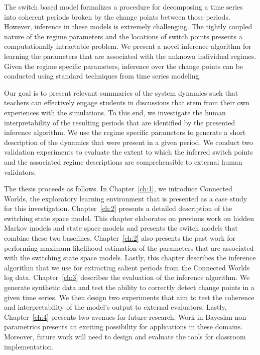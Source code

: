 The switch based model formalizes a procedure for decomposing a time series into coherent periods broken by the change points between those periods. However, inference in these models is extremely challenging. The tightly coupled nature of the regime parameters and the locations of switch points presents a computationally intractable problem. We present a novel inference algorithm for learning the parameters that are associated with the unknown individual regimes. Given the regime specific parameters, inference over the change points can be conducted using standard techniques from time series modeling.

Our goal is to present relevant summaries of the system dynamics such that teachers can effectively engage students in discussions that stem from their own experiences with the simulations. To this end, we investigate the human interpretability of the resulting periods that are identified by the presented inference algorithm. We use the regime specific parameters to generate a short description of the dynamics that were present in a given period. We conduct two validation experiments to evaluate the extent to which the inferred switch points and the associated regime descriptions are comprehensible to external human validators.

The thesis proceeds as follows. In Chapter~\ref{ch:1}, we introduce Connected Worlds, the exploratory learning environment that is presented as a case study for this investigation. Chapter~\ref{ch:2} presents a detailed description of the switching state space model. This chapter elaborates on previous work on hidden Markov models and state space models and presents the switch models that combine these two baselines. Chapter~\ref{ch:2} also presents the past work for performing maximum likelihood estimation of the parameters that are associated with the switching state space models. Lastly, this chapter describes the inference algorithm that we use for extracting salient periods from the Connected Worlds log data. Chapter~\ref{ch:3} describes the evaluation of the inference algorithm. We generate synthetic data and test the ability to correctly detect change points in a given time series. We then design two experiments that aim to test the coherence and interpretability of the model's output to external evaluators. Lastly, Chapter~\ref{ch:4} presents two avenues for future research. Work in Bayesian non-parametrics presents an exciting possibility for applications in these domains. Moreover, future work will need to design and evaluate the tools for classroom implementation.
